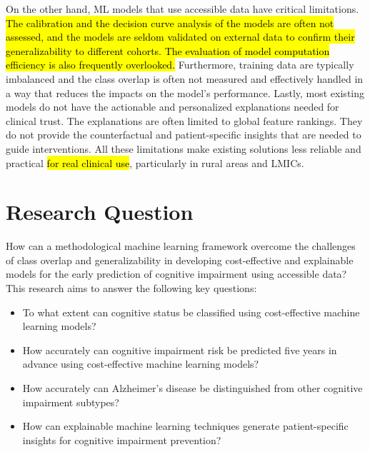 On the other hand, ML models that use accessible data have critical limitations. \hl{The calibration and the decision curve analysis of the models are often not assessed, and the models are seldom validated on external data to confirm their generalizability to different cohorts. The evaluation of model computation efficiency is also frequently overlooked.} Furthermore, training data are typically imbalanced and the class overlap is often not measured and effectively handled in a way that reduces the impacts on the model's performance. Lastly, most existing models do not have the actionable and personalized explanations needed for clinical trust. The explanations are often limited to global feature rankings. They do not provide the counterfactual and patient-specific insights that are needed to guide interventions. All these limitations make existing solutions less reliable and practical \hl{for real clinical use}, particularly in rural areas and LMICs.

\section{Research Question}
How can a methodological machine learning framework overcome the challenges of class overlap and generalizability in developing cost-effective and explainable models for the early prediction of cognitive impairment using accessible data?
This research aims to answer the following key questions:
\begin{itemize}
    \item To what extent can cognitive status be classified using cost-effective machine learning models?
    \item How accurately can cognitive impairment risk be predicted five years in advance using cost-effective machine learning models?
    \item How accurately can Alzheimer’s disease be distinguished from other cognitive impairment subtypes?
    \item How can explainable machine learning techniques generate patient-specific insights for cognitive impairment prevention?
\end{itemize}

